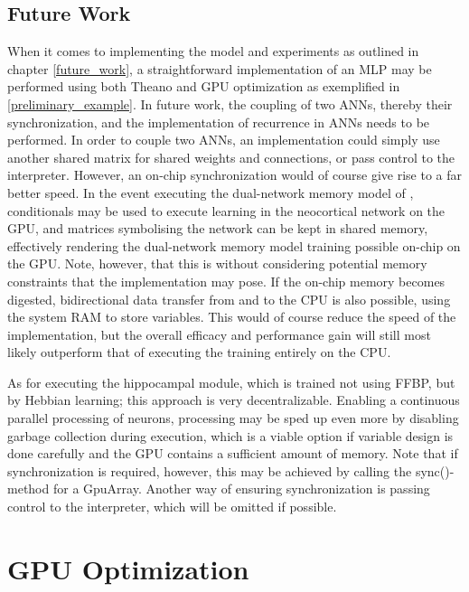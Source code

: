\subsection{Future Work}

When it comes to implementing the model and experiments as outlined in chapter \ref{future_work}, a straightforward implementation of an MLP may be performed using both Theano and GPU optimization as exemplified in \ref{preliminary_example}. In future work, the coupling of two ANNs, thereby their synchronization, and the implementation of recurrence in ANNs needs to be performed. In order to couple two ANNs, an implementation could simply use another shared matrix for shared weights and connections, or pass control to the interpreter. However, an on-chip synchronization would of course give rise to a far better speed. In the event executing the dual-network memory model of \cite{Hattori2014}, conditionals may be used to execute learning in the neocortical network on the GPU, and matrices symbolising the network can be kept in shared memory, effectively rendering the dual-network memory model training possible on-chip on the GPU. Note, however, that this is without considering potential memory constraints that the implementation may pose. If the on-chip memory becomes digested, bidirectional data transfer from and to the CPU is also possible, using the system RAM to store variables. This would of course reduce the speed of the implementation, but the overall efficacy and performance gain will still most likely outperform that of executing the training entirely on the CPU.

As for executing the hippocampal module, which is trained not using FFBP, but by Hebbian learning; this approach is very decentralizable. Enabling a continuous parallel processing of neurons, processing may be sped up even more by disabling garbage collection during execution, which is a viable option if variable design is done carefully and the GPU contains a sufficient amount of memory. Note that if synchronization is required, however, this may be achieved by calling the sync()-method for a GpuArray. Another way of ensuring synchronization is passing control to the interpreter, which will be omitted if possible.


\section{GPU Optimization}

